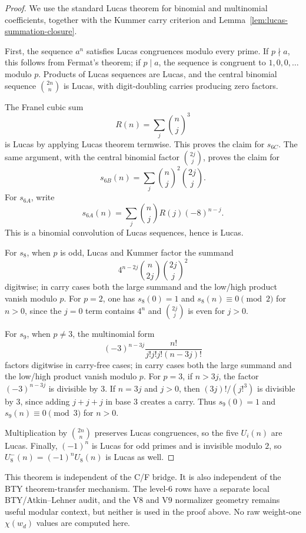 \documentclass[11pt,a4paper]{article}
\begin{document}
\begin{proof}
We use the standard Lucas theorem for binomial and multinomial coefficients,
together with the Kummer carry criterion and Lemma~\ref{lem:lucas-summation-closure}.

First, the sequence $a^n$ satisfies Lucas congruences modulo every prime.  If
$p\nmid a$, this follows from Fermat's theorem; if $p\mid a$, the sequence is
congruent to $1,0,0,\ldots$ modulo $p$.  Products of Lucas sequences are
Lucas, and the central binomial sequence $\binom{2n}{n}$ is Lucas, with
digit-doubling carries producing zero factors.

The Franel cubic sum
\[
  R(n)=\sum_j\binom{n}{j}^3
\]
is Lucas by applying Lucas theorem termwise.  This proves the claim for
$s_{6C}$.  The same argument, with the central binomial factor
$\binom{2j}{j}$, proves the claim for
\[
  s_{6B}(n)=\sum_j\binom{n}{j}^2\binom{2j}{j}.
\]
For $s_{6A}$, write
\[
  s_{6A}(n)=\sum_j\binom{n}{j}R(j)(-8)^{n-j}.
\]
This is a binomial convolution of Lucas sequences, hence is Lucas.

For $s_8$, when $p$ is odd, Lucas and Kummer factor the summand
\[
  4^{n-2j}\binom{n}{2j}\binom{2j}{j}^2
\]
digitwise; in carry cases both the large summand and the low/high product
vanish modulo $p$.  For $p=2$, one has $s_8(0)=1$
and $s_8(n)\equiv0\pmod2$ for $n>0$, since the $j=0$ term contains $4^n$
and $\binom{2j}{j}$ is even for $j>0$.

For $s_9$, when $p\ne3$, the multinomial form
\[
  (-3)^{n-3j}\frac{n!}{j!j!j!(n-3j)!}
\]
factors digitwise in carry-free cases; in carry cases both the large summand
and the low/high product vanish modulo $p$.
For $p=3$, if $n>3j$, the factor $(-3)^{n-3j}$ is divisible by $3$.  If
$n=3j$ and $j>0$, then $(3j)!/(j!^3)$ is divisible by $3$, since adding
$j+j+j$ in base $3$ creates a carry.  Thus $s_9(0)=1$ and
$s_9(n)\equiv0\pmod3$ for $n>0$.

Multiplication by $\binom{2n}{n}$ preserves Lucas congruences, so the five
$U_i(n)$ are Lucas.  Finally, $(-1)^n$ is Lucas for odd primes and is
invisible modulo $2$, so $U_8^-(n)=(-1)^nU_8(n)$ is Lucas as well.
\end{proof}

This theorem is independent of the C/F bridge.  It is also independent of the
BTY theorem-transfer mechanism.  The level-6 rows have a separate local
BTY/Atkin--Lehner audit, and the \(\mathrm{V8}\) and \(\mathrm{V9}\) normalizer geometry remains useful
modular context, but neither is used in the proof above.  No raw weight-one
$\chi(w_d)$ values are computed here.
\end{document}
